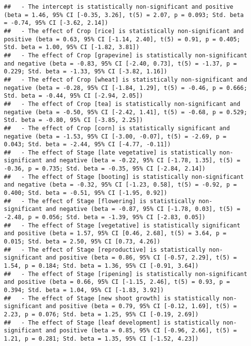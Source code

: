 \documentclass[
]{article}
\begin{document}
\begin{verbatim}
##   - The intercept is statistically non-significant and positive (beta = 1.46, 95% CI [-0.35, 3.26], t(5) = 2.07, p = 0.093; Std. beta = -0.74, 95% CI [-3.62, 2.14])
##   - The effect of Crop [rice] is statistically non-significant and positive (beta = 0.63, 95% CI [-1.14, 2.40], t(5) = 0.91, p = 0.405; Std. beta = 1.00, 95% CI [-1.82, 3.81])
##   - The effect of Crop [grapevine] is statistically non-significant and negative (beta = -0.83, 95% CI [-2.40, 0.73], t(5) = -1.37, p = 0.229; Std. beta = -1.33, 95% CI [-3.82, 1.16])
##   - The effect of Crop [wheat] is statistically non-significant and negative (beta = -0.28, 95% CI [-1.84, 1.29], t(5) = -0.46, p = 0.666; Std. beta = -0.44, 95% CI [-2.94, 2.05])
##   - The effect of Crop [tea] is statistically non-significant and negative (beta = -0.50, 95% CI [-2.42, 1.41], t(5) = -0.68, p = 0.529; Std. beta = -0.80, 95% CI [-3.85, 2.25])
##   - The effect of Crop [corn] is statistically significant and negative (beta = -1.53, 95% CI [-3.00, -0.07], t(5) = -2.69, p = 0.043; Std. beta = -2.44, 95% CI [-4.77, -0.11])
##   - The effect of Stage [late vegetative] is statistically non-significant and negative (beta = -0.22, 95% CI [-1.78, 1.35], t(5) = -0.36, p = 0.735; Std. beta = -0.35, 95% CI [-2.84, 2.14])
##   - The effect of Stage [booting] is statistically non-significant and negative (beta = -0.32, 95% CI [-1.23, 0.58], t(5) = -0.92, p = 0.400; Std. beta = -0.51, 95% CI [-1.95, 0.92])
##   - The effect of Stage [flowering] is statistically non-significant and negative (beta = -0.87, 95% CI [-1.78, 0.03], t(5) = -2.48, p = 0.056; Std. beta = -1.39, 95% CI [-2.83, 0.05])
##   - The effect of Stage [vegetative] is statistically significant and positive (beta = 1.57, 95% CI [0.46, 2.68], t(5) = 3.64, p = 0.015; Std. beta = 2.50, 95% CI [0.73, 4.26])
##   - The effect of Stage [reproductive] is statistically non-significant and positive (beta = 0.86, 95% CI [-0.57, 2.29], t(5) = 1.54, p = 0.184; Std. beta = 1.36, 95% CI [-0.91, 3.64])
##   - The effect of Stage [ripening] is statistically non-significant and positive (beta = 0.66, 95% CI [-1.15, 2.46], t(5) = 0.93, p = 0.394; Std. beta = 1.04, 95% CI [-1.83, 3.92])
##   - The effect of Stage [new shoot growth] is statistically non-significant and positive (beta = 0.79, 95% CI [-0.12, 1.69], t(5) = 2.23, p = 0.076; Std. beta = 1.25, 95% CI [-0.19, 2.69])
##   - The effect of Stage [leaf development] is statistically non-significant and positive (beta = 0.85, 95% CI [-0.96, 2.66], t(5) = 1.21, p = 0.281; Std. beta = 1.35, 95% CI [-1.52, 4.23])

\end{verbatim}
\end{document}
